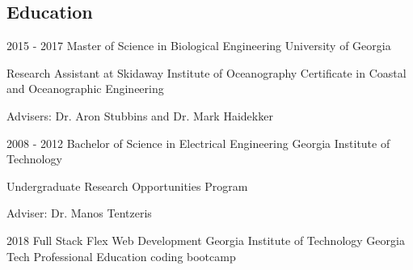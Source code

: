 \documentclass[]{cv}
\begin{document}
\begin{body}
	\section{Education}
        \vspace{0.05cm}
		\begin{entrylist}
			\entry
    			{2015 - 2017}
    			{Master of Science in Biological Engineering}
    			{University of Georgia}
    			{Research Assistant at Skidaway Institute of Oceanography \newline Certificate in Coastal and Oceanographic Engineering
    				\begin{description}
    					\item {Advisers: Dr. Aron Stubbins and Dr. Mark Haidekker}
    				\end{description}}
			\entry
    			{2008 - 2012}
    			{Bachelor of Science in Electrical Engineering}
    			{Georgia Institute of Technology}
    			{Undergraduate Research Opportunities Program
    				\begin{description}
    					\item {Adviser: Dr. Manos Tentzeris}
    				\end{description}
                }
    		\entry
        		{2018}
        		{Full Stack Flex Web Development}
        		{Georgia Institute of Technology}
        		{Georgia Tech Professional Education coding bootcamp}
		\end{entrylist}
\end{body}
\end{document}
